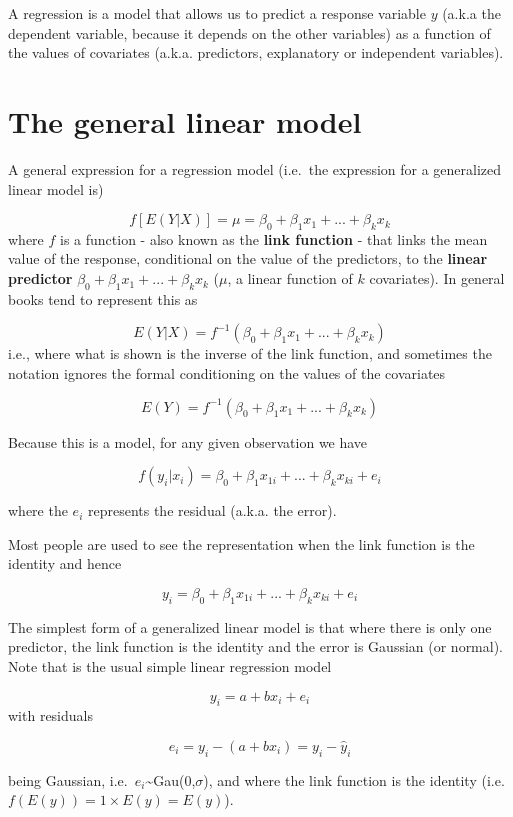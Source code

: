 \documentclass[
]{book}
\begin{document}
A regression is a model that allows us to predict a response variable \(y\) (a.k.a the dependent variable, because it depends on the other variables) as a function of the values of covariates (a.k.a. predictors, explanatory or independent variables).

\hypertarget{the-general-linear-model}{%
\section{The general linear model}\label{the-general-linear-model}}

A general expression for a regression model (i.e.~the expression for a generalized linear model is)

\[ f[E(Y|X)] = \mu = \beta_0+\beta_1 x_1 + ... + \beta_k x_k \]
where \(f\) is a function - also known as the \textbf{link function} - that links the mean value of the response, conditional on the value of the predictors, to the \textbf{linear predictor} \(\beta_0+\beta_1 x_1 + ... + \beta_k x_k\) (\(\mu\), a linear function of \(k\) covariates). In general books tend to represent this as

\[ E(Y|X) =  f^{-1}(\beta_0+\beta_1 x_1 + ... + \beta_k x_k) \]
i.e., where what is shown is the inverse of the link function,
and sometimes the notation ignores the formal conditioning on the values of the covariates

\[ E(Y) =  f^{-1}(\beta_0+\beta_1 x_1 + ... + \beta_k x_k) \]

Because this is a model, for any given observation we have

\[ f{(y_i|x_i)} =  \beta_0+\beta_1 x_{1i} + ... + \beta_k x_{ki} + e_i \]

where the \(e_i\) represents the residual (a.k.a. the error).

Most people are used to see the representation when the link function is the identity and hence

\[ y_i =  \beta_0+\beta_1 x_{1i} + ... + \beta_k x_{ki} + e_i \]

The simplest form of a generalized linear model is that where there is only one predictor, the link function is the identity and the error is Gaussian (or normal). Note that is the usual simple linear regression model

\[y_i=a+bx_i+e_i\]
with residuals

\[e_i=y_i - (a+bx_i)= y_i-\hat y_i\]

being Gaussian, i.e.~\(e_i\)\textasciitilde Gau(0,\(\sigma\)), and where the link function is the identity (i.e.~\(f(E(y))=1 \times E(y)=E(y)\)).
\end{document}
